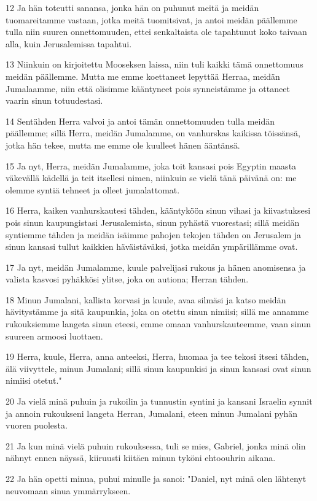 \par 12 Ja hän toteutti sanansa, jonka hän on puhunut meitä ja meidän tuomareitamme vastaan, jotka meitä tuomitsivat, ja antoi meidän päällemme tulla niin suuren onnettomuuden, ettei senkaltaista ole tapahtunut koko taivaan alla, kuin Jerusalemissa tapahtui.
\par 13 Niinkuin on kirjoitettu Mooseksen laissa, niin tuli kaikki tämä onnettomuus meidän päällemme. Mutta me emme koettaneet lepyttää Herraa, meidän Jumalaamme, niin että olisimme kääntyneet pois synneistämme ja ottaneet vaarin sinun totuudestasi.
\par 14 Sentähden Herra valvoi ja antoi tämän onnettomuuden tulla meidän päällemme; sillä Herra, meidän Jumalamme, on vanhurskas kaikissa töissänsä, jotka hän tekee, mutta me emme ole kuulleet hänen ääntänsä.
\par 15 Ja nyt, Herra, meidän Jumalamme, joka toit kansasi pois Egyptin maasta väkevällä kädellä ja teit itsellesi nimen, niinkuin se vielä tänä päivänä on: me olemme syntiä tehneet ja olleet jumalattomat.
\par 16 Herra, kaiken vanhurskautesi tähden, kääntyköön sinun vihasi ja kiivastuksesi pois sinun kaupungistasi Jerusalemista, sinun pyhästä vuorestasi; sillä meidän syntiemme tähden ja meidän isäimme pahojen tekojen tähden on Jerusalem ja sinun kansasi tullut kaikkien häväistäväksi, jotka meidän ympärillämme ovat.
\par 17 Ja nyt, meidän Jumalamme, kuule palvelijasi rukous ja hänen anomisensa ja valista kasvosi pyhäkkösi ylitse, joka on autiona; Herran tähden.
\par 18 Minun Jumalani, kallista korvasi ja kuule, avaa silmäsi ja katso meidän hävitystämme ja sitä kaupunkia, joka on otettu sinun nimiisi; sillä me annamme rukouksiemme langeta sinun eteesi, emme omaan vanhurskauteemme, vaan sinun suureen armoosi luottaen.
\par 19 Herra, kuule, Herra, anna anteeksi, Herra, huomaa ja tee tekosi itsesi tähden, älä viivyttele, minun Jumalani; sillä sinun kaupunkisi ja sinun kansasi ovat sinun nimiisi otetut."
\par 20 Ja vielä minä puhuin ja rukoilin ja tunnustin syntini ja kansani Israelin synnit ja annoin rukoukseni langeta Herran, Jumalani, eteen minun Jumalani pyhän vuoren puolesta.
\par 21 Ja kun minä vielä puhuin rukouksessa, tuli se mies, Gabriel, jonka minä olin nähnyt ennen näyssä, kiiruusti kiitäen minun tyköni ehtoouhrin aikana.
\par 22 Ja hän opetti minua, puhui minulle ja sanoi: "Daniel, nyt minä olen lähtenyt neuvomaan sinua ymmärrykseen.
